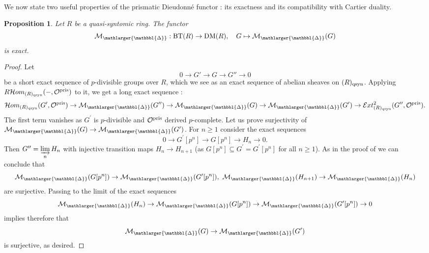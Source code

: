 \documentclass{amsart}
\newcommand{\prism}{{\mathlarger{\mathbbl{\Delta}}}}
\theoremstyle{plain}
\newtheorem{proposition}[theorem]{Proposition}
\theoremstyle{definition}
\newcommand{\BT}{\mathrm{BT}}
\begin{document}
We now state two useful properties of the prismatic Dieudonn\'e functor : its exactness and its compatibility with Cartier duality. 

\begin{proposition} \label{sec:divid-prism-dieud-exactness}
Let $R$ be a quasi-syntomic ring. The functor
\[ \mathcal{M}_{\prism} : \BT(R) \to \mathrm{DM}(R), \quad  G \mapsto \mathcal{M}_{\prism}(G) \]
is exact.
\end{proposition}
\begin{proof}
Let 
\[ 0 \to G' \to G \to G'' \to 0 \] 
be a short exact sequence of $p$-divisible groups over $R$, which we see as an exact sequence of abelian sheaves on $(R)_{\rm qsyn}$. Applying $R\mathcal{H}om_{(R)_{\rm qsyn}}(-, \mathcal{O}^{\rm pris})$ to it, we get a long exact sequence :
\[  \mathcal{H}om_{(R)_{\rm qsyn}}(G',\mathcal{O}^{\rm pris}) \to \mathcal{M}_{\prism}(G'') \to \mathcal{M}_{\prism}(G) \to \mathcal{M}_{\prism}(G') \to  \mathcal{E}xt_{(R)_{\rm qsyn}}^2(G'',\mathcal{O}^{\rm pris}).  \]
The first term vanishes as $G^\prime$ is $p$-divisible and $\mathcal{O}^{\rm pris}$ derived $p$-complete. Let us prove surjectivity of $\mathcal{M}_\prism(G)\to \mathcal{M}_\prism(G^\prime)$. For $n\geq 1$ consider the exact sequences
  $$
  0\to G^\prime[p^n]\to G[p^n]\to H_n\to 0.
  $$
  Then $G^{\prime\prime}=\varinjlim\limits_n H_n$ with injective transition maps $H_n\to H_{n+1}$ (as $G[p^{n}]\subseteq G^\prime=G^\prime[p^n]$ for all $n\geq 1$). As in the proof of  we can conclude that
  $$
  \mathcal{M}_\prism(G[p^n])\to \mathcal{M}_\prism(G^\prime[p^n]),\ \mathcal{M}_\prism(H_{n+1})\to \mathcal{M}_\prism(H_n) 
  $$
  are surjective. Passing to the limit of the exact sequences
  $$
  \mathcal{M}_{\prism}(H_n) \to \mathcal{M}_{\prism}(G[p^n]) \to \mathcal{M}_{\prism}(G'[p^n]) \to 0
  $$
  implies therefore that
  $$
  \mathcal{M}_\prism(G)\to \mathcal{M}_\prism(G^\prime)
  $$
  is surjective, as desired.
\end{proof}
\end{document}
